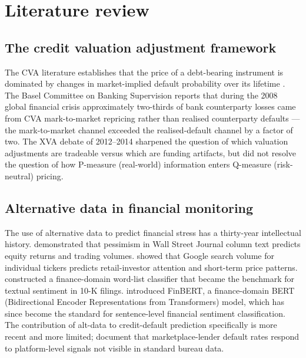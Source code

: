 \documentclass[11pt,a4paper]{article}
\begin{document}
\section{Literature review}\label{sec:litreview}

\subsection{The credit valuation adjustment framework}

The CVA literature establishes that the price of a debt-bearing instrument is dominated by changes in market-implied default probability over its lifetime \citep{brigomorinipallavicini2013}. The Basel Committee on Banking Supervision \citep{basel2011cva} reports that during the 2008 global financial crisis approximately two-thirds of bank counterparty losses came from CVA mark-to-market repricing rather than realised counterparty defaults --- the mark-to-market channel exceeded the realised-default channel by a factor of two. The XVA debate of 2012--2014 \citep{hullwhite2012fva,burgardkjaer2013funding} sharpened the question of which valuation adjustments are tradeable versus which are funding artifacts, but did not resolve the question of how P-measure (real-world) information enters Q-measure (risk-neutral) pricing.

\subsection{Alternative data in financial monitoring}

The use of alternative data to predict financial stress has a thirty-year intellectual history. \citet{tetlock2007giving} demonstrated that pessimism in Wall Street Journal column text predicts equity returns and trading volumes. \citet{daengelberggao2011searchattention} showed that Google search volume for individual tickers predicts retail-investor attention and short-term price patterns. \citet{loughranmcdonald2011when} constructed a finance-domain word-list classifier that became the benchmark for textual sentiment in 10-K filings. \citet{araci2019finbert} introduced FinBERT, a finance-domain BERT (Bidirectional Encoder Representations from Transformers) model, which has since become the standard for sentence-level financial sentiment classification. The contribution of alt-data to credit-default prediction specifically is more recent and more limited; \citet{difilippo2018marketplace} document that marketplace-lender default rates respond to platform-level signals not visible in standard bureau data.
\end{document}
